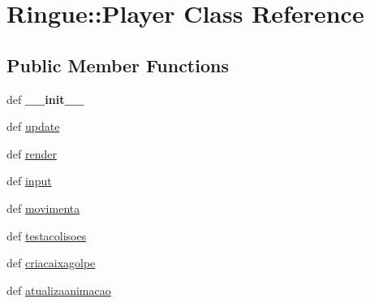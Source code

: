 \hypertarget{class_ringue_1_1_player}{
\section{Ringue::Player Class Reference}
\label{class_ringue_1_1_player}
}
\subsection*{Public Member Functions}
\begin{CompactItemize}
\item 
\hypertarget{class_ringue_1_1_player_d86fc26ccc1f0cb38751af8f117b9bf1}{
def \textbf{\_\-\_\-init\_\-\_\-}}
\label{class_ringue_1_1_player_d86fc26ccc1f0cb38751af8f117b9bf1}

\item 
def \hyperlink{class_ringue_1_1_player_9fa5d2bc228a1cad2e92a51b47a9379e}{update}
\item 
def \hyperlink{class_ringue_1_1_player_a3e631f4c903e4a318585caa600a7515}{render}
\item 
def \hyperlink{class_ringue_1_1_player_864011c781e87c75f0ff5a2e39a9e720}{input}
\item 
def \hyperlink{class_ringue_1_1_player_b7a5bb4b3b2c1d56065fee5c585e7f77}{movimenta}
\item 
def \hyperlink{class_ringue_1_1_player_2d879892de2f1e020610deb1ad309ca3}{testacolisoes}
\item 
def \hyperlink{class_ringue_1_1_player_5258ca1ee9a65ec941108816dbdce208}{criacaixagolpe}
\item 
def \hyperlink{class_ringue_1_1_player_524cfab0489c55f2a6d9b1929cf95d1a}{atualizaanimacao}
\end{CompactItemize}

